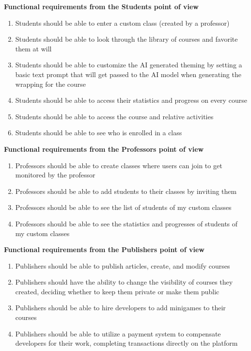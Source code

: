 \textbf{Functional requirements from the Students point of view}
\begin{enumerate}[start=8,label={\bfseries FR \arabic*.}]
	\item Students should be able to enter a custom class (created by a professor)
	\item Students should be able to look through the library of courses and favorite them at will
	\item Students should be able to customize the AI generated theming by setting a basic text prompt that will get passed to the AI model when generating the wrapping for the course
	\item Students should be able to access their statistics and progress on every course
	\item Students should be able to access the course and relative activities
	\item Students should be able to see who is enrolled in a class
\end{enumerate}

\textbf{Functional requirements from the Professors point of view}
\begin{enumerate}[start=14,label={\bfseries FR \arabic*.}]
	\item Professors should be able to create classes where users can join to get monitored by the professor
	\item Professors should be able to add students to their classes by inviting them
	\item Professors should be able to see the list of students of my custom classes
	\item Professors should be able to see the statistics and progresses of students of my custom classes
\end{enumerate}

\textbf{Functional requirements from the Publishers point of view}
\begin{enumerate}[start=18,label={\bfseries FR \arabic*.}]
	\item Publishers should be able to publish articles, create, and modify courses
	\item Publishers should have the ability to change the visibility of courses they created, deciding whether to keep them private or make them public
	\item Publishers should be able to hire developers to add minigames to their courses
	\item Publishers should be able to utilize a payment system to compensate developers for their work, completing transactions directly on the platform
\end{enumerate}

